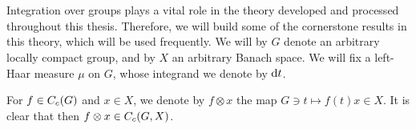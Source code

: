 \appendix
\chapter{}
\apptitle
{}
Integration over groups plays a vital role in the theory developed and processed throughout this thesis. Therefore, we will build some of the cornerstone results in this theory, which will be used frequently. We will by $G$ denote an arbitrary locally compact group, and by $X$ an arbitrary Banach space. We will fix a left-Haar measure $\mu$ on $G$, whose integrand we denote by $\mathrm{d} t$.

For $f \in C_c(G)$ and $x \in X$, we denote by $f \otimes x$ the map $G \ni t \mapsto f(t)x \in X$. It is clear that then $f \otimes x \in C_c(G,X)$.
